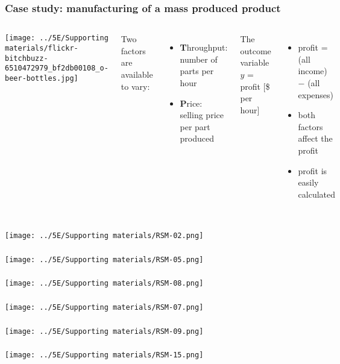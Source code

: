 \documentclass[handout,11pt,aspectratio=169,mathserif]{beamer}
\begin{document}
\begin{frame}\frametitle{Case study: manufacturing of a mass produced product}
	\begin{columns}[c]
				\centerline{\texttt{[image: ../5E/Supporting materials/flickr-bitchbuzz-6510472979\_bf2db00108\_o-beer-bottles.jpg]}}
			Two factors are available to vary:
			\begin{itemize}
				\item	\textbf{T}hroughput: number of parts per hour
				\item	\textbf{P}rice: selling price per part produced
			\end{itemize}
			
			\vspace{1cm}
			\pause
			The outcome variable $y$ = profit [\$ per hour]
			
			\begin{itemize}
				\item	profit = (all income) $-$ (all expenses) \pause
				\item	both factors affect the profit
				\item	profit is easily calculated 
			\end{itemize}
	\end{columns}
\end{frame}
\begin{frame}\frametitle{}
	\centerline{\texttt{[image: ../5E/Supporting materials/RSM-02.png]}}
\end{frame}
\begin{frame}\frametitle{}
	\centerline{\texttt{[image: ../5E/Supporting materials/RSM-05.png]}}
\end{frame}
\begin{frame}\frametitle{}
	\centerline{\texttt{[image: ../5E/Supporting materials/RSM-08.png]}}
\end{frame}
\begin{frame}\frametitle{}
	\centerline{\texttt{[image: ../5E/Supporting materials/RSM-07.png]}}
\end{frame}
\begin{frame}\frametitle{}
	\centerline{\texttt{[image: ../5E/Supporting materials/RSM-09.png]}}
\end{frame}
\begin{frame}\frametitle{}
	\centerline{\texttt{[image: ../5E/Supporting materials/RSM-15.png]}}
\end{frame}
\end{document}
